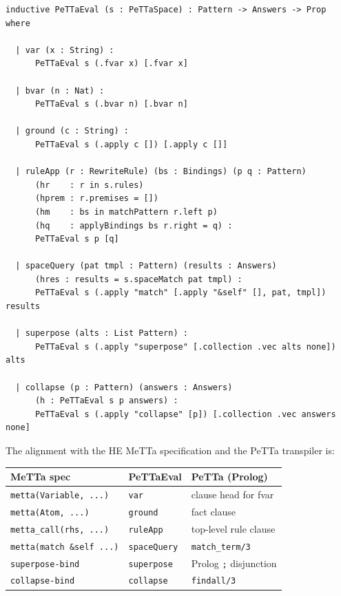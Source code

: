 \documentclass[]{article}
\newcommand{\code}[1]{\texttt{#1}}
\begin{document}
\begin{lstlisting}[language=lean]
inductive PeTTaEval (s : PeTTaSpace) : Pattern -> Answers -> Prop where

  | var (x : String) :
      PeTTaEval s (.fvar x) [.fvar x]

  | bvar (n : Nat) :
      PeTTaEval s (.bvar n) [.bvar n]

  | ground (c : String) :
      PeTTaEval s (.apply c []) [.apply c []]

  | ruleApp (r : RewriteRule) (bs : Bindings) (p q : Pattern)
      (hr    : r in s.rules)
      (hprem : r.premises = [])
      (hm    : bs in matchPattern r.left p)
      (hq    : applyBindings bs r.right = q) :
      PeTTaEval s p [q]

  | spaceQuery (pat tmpl : Pattern) (results : Answers)
      (hres : results = s.spaceMatch pat tmpl) :
      PeTTaEval s (.apply "match" [.apply "&self" [], pat, tmpl]) results

  | superpose (alts : List Pattern) :
      PeTTaEval s (.apply "superpose" [.collection .vec alts none]) alts

  | collapse (p : Pattern) (answers : Answers)
      (h : PeTTaEval s p answers) :
      PeTTaEval s (.apply "collapse" [p]) [.collection .vec answers none]
\end{lstlisting}

The alignment with the HE MeTTa specification and the PeTTa transpiler is:

\begin{center}
\begin{tabular}{lll}
\hline
\textbf{MeTTa spec} & \textbf{PeTTaEval} & \textbf{PeTTa (Prolog)} \\
\hline
\code{metta(Variable, ...)} & \code{var} & clause head for fvar \\
\code{metta(Atom, ...)} & \code{ground} & fact clause \\
\code{metta\_call(rhs, ...)} & \code{ruleApp} & top-level rule clause \\
\code{metta(match \&self ...)} & \code{spaceQuery} & \code{match\_term/3} \\
\code{superpose-bind} & \code{superpose} & Prolog \code{;} disjunction \\
\code{collapse-bind} & \code{collapse} & \code{findall/3} \\
\hline
\end{tabular}
\end{center}
\end{document}
